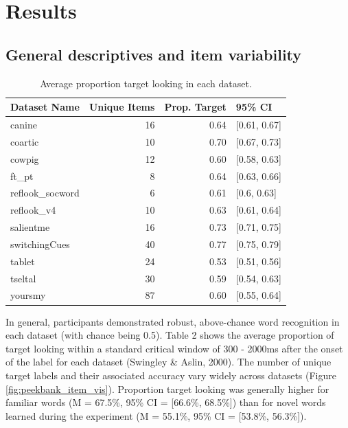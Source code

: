 \documentclass[10pt, letterpaper]{article}
\begin{document}
\hypertarget{results}{%
\section{Results}\label{results}}

\hypertarget{general-descriptives-and-item-variability}{%
\subsection{General descriptives and item
variability}\label{general-descriptives-and-item-variability}}

\begin{table}[H]
\centering
\begingroup\fontsize{9pt}{10pt}\selectfont
\begin{tabular}{lrrl}
  \hline
Dataset Name & Unique Items & Prop. Target & 95\% CI \\ 
  \hline
canine & 16 & 0.64 & [0.61, 0.67] \\ 
  coartic & 10 & 0.70 & [0.67, 0.73] \\ 
  cowpig & 12 & 0.60 & [0.58, 0.63] \\ 
  ft\_pt & 8 & 0.64 & [0.63, 0.66] \\ 
  reflook\_socword & 6 & 0.61 & [0.6, 0.63] \\ 
  reflook\_v4 & 10 & 0.63 & [0.61, 0.64] \\ 
  salientme & 16 & 0.73 & [0.71, 0.75] \\ 
  switchingCues & 40 & 0.77 & [0.75, 0.79] \\ 
  tablet & 24 & 0.53 & [0.51, 0.56] \\ 
  tseltal & 30 & 0.59 & [0.54, 0.63] \\ 
  yoursmy & 87 & 0.60 & [0.55, 0.64] \\ 
   \hline
\end{tabular}
\endgroup
\caption{Average proportion target looking in each dataset.} 
\end{table}

In general, participants demonstrated robust, above-chance word
recognition in each dataset (with chance being 0.5). Table 2 shows the
average proportion of target looking within a standard critical window
of 300 - 2000ms after the onset of the label for each dataset (Swingley
\& Aslin, 2000). The number of unique target labels and their associated
accuracy vary widely across datasets (Figure
\ref{fig:peekbank_item_vis}). Proportion target looking was generally
higher for familiar words (M = 67.5\%, 95\% CI = {[}66.6\%, 68.5\%{]})
than for novel words learned during the experiment (M = 55.1\%, 95\% CI
= {[}53.8\%, 56.3\%{]}).
\end{document}
